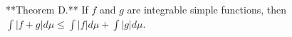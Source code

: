 **Theorem D.** If $f$ and $g$ are integrable simple functions, then $\int |f + g| d\mu \leq \int |f| d\mu + \int |g| d\mu$.
